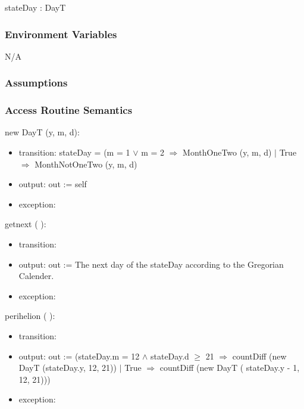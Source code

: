 \documentclass[12pt, titlepage]{article}
\begin{document}
stateDay : DayT \\

\subsubsection{Environment Variables}

N/A\\

\subsubsection{Assumptions}


\subsubsection{ Access Routine Semantics}

\noindent  new DayT (y, m, d):
\begin{itemize}
\item transition:  stateDay = (m = 1 $\lor$ m = 2 $\Rightarrow$ MonthOneTwo (y, m, d) $|$ True $\Rightarrow$ MonthNotOneTwo (y, m, d)\\

\item output: out := self
\item exception: 
\end{itemize}

\noindent  getnext ( ):
\begin{itemize}
\item transition: 
\item output: out := The next day of the  stateDay according to the Gregorian Calender.
\item exception:
\end{itemize}

\noindent  perihelion ( ):
\begin{itemize}
\item transition: 
\item output: out := (stateDay.m = 12 $	\wedge$ stateDay.d $\geq	$ 21 $\Rightarrow$  countDiff (new DayT (stateDay.y, 12, 21)) $|$ True $\Rightarrow$ countDiff (new DayT ( stateDay.y - 1, 12, 21)))
\item exception:
\end{itemize}
\end{document}
